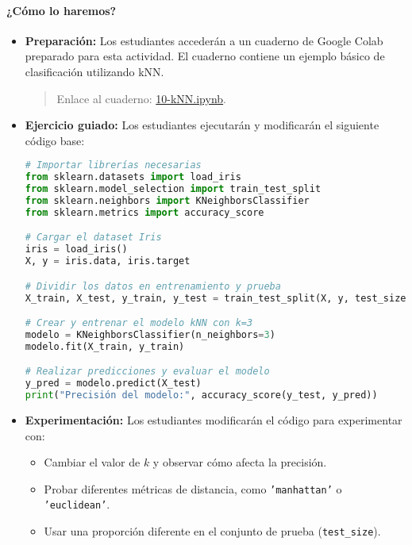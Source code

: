 \documentclass[a4,11pt]{aleph-notas}
\begin{document}
\paragraph{¿Cómo lo haremos?}  
\begin{itemize}[leftmargin=*]
    \item \textbf{Preparación:}  
    Los estudiantes accederán a un cuaderno de Google Colab preparado para esta actividad. El cuaderno contiene un ejemplo básico de clasificación utilizando kNN.
    \begin{quote}
        Enlace al cuaderno: \href{https://colab.research.google.com/github/andres-merino/AprendizajeAutomaticoInicial-05-N0105/blob/main/2-Notebooks/10-kNN.ipynb}{10-kNN.ipynb}.
    \end{quote}

    \item \textbf{Ejercicio guiado:}  
    Los estudiantes ejecutarán y modificarán el siguiente código base:
\begin{pycodigo}
\begin{lstlisting}[language=Python]
# Importar librerías necesarias
from sklearn.datasets import load_iris
from sklearn.model_selection import train_test_split
from sklearn.neighbors import KNeighborsClassifier
from sklearn.metrics import accuracy_score

# Cargar el dataset Iris
iris = load_iris()
X, y = iris.data, iris.target

# Dividir los datos en entrenamiento y prueba
X_train, X_test, y_train, y_test = train_test_split(X, y, test_size=0.3, random_state=42)

# Crear y entrenar el modelo kNN con k=3
modelo = KNeighborsClassifier(n_neighbors=3)
modelo.fit(X_train, y_train)

# Realizar predicciones y evaluar el modelo
y_pred = modelo.predict(X_test)
print("Precisión del modelo:", accuracy_score(y_test, y_pred))
\end{lstlisting}
\end{pycodigo}

    \item \textbf{Experimentación:}  
    Los estudiantes modificarán el código para experimentar con:
    \begin{itemize}[leftmargin=*]
        \item Cambiar el valor de \(k\) y observar cómo afecta la precisión.
        \item Probar diferentes métricas de distancia, como \texttt{'manhattan'} o \texttt{'euclidean'}.
        \item Usar una proporción diferente en el conjunto de prueba (\texttt{test\_size}).
    \end{itemize}
\end{itemize}
\end{document}
